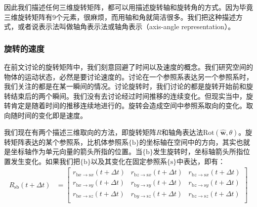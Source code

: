 \documentclass[12pt, a4paper, article, UTF8]{ctexart}
\begin{document}
因此我们描述任何三维旋转矩阵，都可以用描述旋转轴和旋转角的方式。因为毕竟三维旋转矩阵有9个元素，很麻烦，而用轴和角就简洁很多。我们把这种描述方式，或者说表示法叫做轴角表示法或轴角表示（axis-angle representation）。


\subsubsection{旋转的速度}
在前文讨论的旋转矩阵中，我们刻意回避了时间以及速度的概念。我们研究空间的物体的运动状态，必然是要讨论速度的。讨论在一个参照系表达另一个参照系时，我们关注的都是在某一瞬间的情况。讨论旋转时，我们讨论的都是旋转开始前和旋转结束后的两个瞬间。我们没有去讨论经过时间推移的连续变化。但现实当中，旋转肯定是随着时间的推移连续地进行的。旋转会造成空间中参照系取向的变化。取向随时间的变化即是速度。

我们现在有两个描述三维取向的方法，即旋转矩阵$R$和轴角表达法$\text{Rot}(\hat{\mathbf{w}},\theta)$。旋转矩阵表达的某个参照系，比机体参照系$\{\text{b}\}$的坐标轴在空间中的方向，其实也就是坐标轴作为单元向量的箭头所指的位置。当$\{\text{b}\}$发生旋转时，坐标轴箭头所指位置发生变化。如果我们把$\{\text{b}\}$以及其变化在固定参照系$\{\text{s}\}$中表达，即有：
\begin{align}
 R_\text{sb}(t+\Delta t) &=
 \begin{bmatrix}
 r_{\text{b}x\rightarrow\text{s}x}(t+\Delta t) &  r_{\text{b}z\rightarrow\text{s}x}(t+\Delta t) &  r_{\text{b}z\rightarrow\text{s}x}(t+\Delta t)\\
 r_{\text{b}x\rightarrow\text{s}y}(t+\Delta t) &  r_{\text{b}y\rightarrow\text{s}y}(t+\Delta t) &  r_{\text{b}z\rightarrow\text{s}y}(t+\Delta t)\\
 r_{\text{b}x\rightarrow\text{s}z}(t+\Delta t) &  r_{\text{b}y\rightarrow\text{s}z}(t+\Delta t) &  r_{\text{b}z\rightarrow\text{s}z}(t+\Delta t)\\
\end{bmatrix}   \label{eq:rotationframechange}
\end{align}
\end{document}
